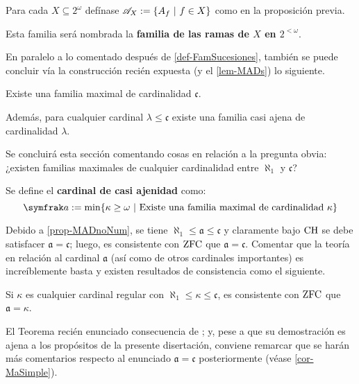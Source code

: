 \begin{definicion}\label{def-FamRamas}
	Para cada $X \subseteq 2^\omega$ defínase $\mathscr{A}_X:=\{A_f \text{ $|$ } f \in X\}$ como en la proposición previa.

	Esta familia será nombrada la \textbf{familia de las ramas de $X$ en $2^{<\omega}$}.
\end{definicion}

En paralelo a lo comentado después de \ref{def-FamSucesiones}, también se puede concluir vía la construcción recién expuesta (y el \autoref{lem-MADs}) lo siguiente.

\begin{corolario}\label{cor-famGrandes}
	Existe una familia maximal de cardinalidad $\mathfrak{c}$.

	Además, para cualquier cardinal $\lambda \leq \mathfrak{c}$ existe una familia casi ajena de cardinalidad $\lambda$.
\end{corolario}

Se concluirá esta sección comentando cosas en relación a la pregunta obvia: ¿existen familias maximales de cualquier cardinalidad entre $\aleph_1$ y $\mathfrak{c}$?

\begin{definicion}
	Se define el \textbf{cardinal de casi ajenidad} como: 
	$$ \mathfrak{a}:=\min\{ \kappa \geq \omega \tq \text{Existe una familia maximal de cardinalidad } \kappa \} $$
\end{definicion}

Debido a \ref{prop-MADnoNum}, se tiene $\aleph_1 \leq \mathfrak{a} \leq \mathfrak{c}$ y claramente bajo $\operatorname{CH}$ se debe satisfacer $\mathfrak{a}=\mathfrak{c}$; luego, es consistente con $\operatorname{ZFC}$ que $\mathfrak{a}=\mathfrak{c}$. Comentar que la teoría en relación al cardinal $\mathfrak{a}$ (así como de otros cardinales importantes) es increíblemente basta y existen resultados de consistencia como el siguiente.

\begin{teorema}\label{teo-stafa}
	Si $\kappa$ es cualquier cardinal regular con $\aleph_1 \leq \kappa \leq \mathfrak{c}$, es consistente con $\operatorname{ZFC}$ que $\mathfrak{a}=\kappa$.
\end{teorema}

El Teorema recién enunciado consecuencia de \cite[Teo.~5.1, p.~127]{kunenHandbook}; y, pese a que su demostración es ajena a los propósitos de la presente disertación, conviene remarcar que se harán más comentarios respecto al enunciado $\mathfrak{a}=\mathfrak{c}$ posteriormente (véase \ref{cor-MaSimple}).

